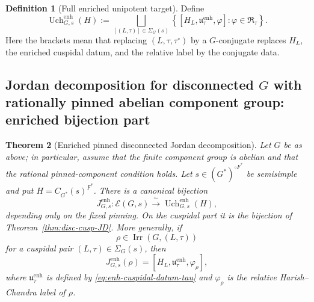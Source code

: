 \documentclass{amsart}
\theoremstyle{plain}
\numberwithin{equation}{section}
\newtheorem{theorem}{Theorem}[section]
\theoremstyle{definition}
\newtheorem{definition}[theorem]{Definition}
\newcommand{\cE}{\mathcal{E}}
\newcommand{\Irr}{\operatorname{Irr}}
\newcommand{\Uch}{\operatorname{Uch}}
\begin{document}
\begin{definition}[Full enriched unipotent target]
\label{def:full-enriched-target}
Define
\[
\Uch^{\mathrm{enh}}_{G,s}(H)
:=
\bigsqcup_{[(L,\tau)]\in\Sigma_G(s)}
\left\{
        [H_L,\mathfrak u^{\mathrm{enh}}_\tau,\varphi]
        :
        \varphi\in\mathfrak R_\tau
\right\}.
\]
Here the brackets mean that replacing \((L,\tau,\tau^\circ)\) by a
\(G\)-conjugate replaces \(H_L\), the enriched cuspidal datum, and the relative
label by the conjugate data.
\end{definition}

\subsection{Jordan decomposition for disconnected $G$ with rationally pinned abelian component group: enriched bijection part}
\begin{theorem}[Enriched pinned disconnected Jordan decomposition]
\label{thm:disc-JD-bijection}
Let \(G\) be as above; in particular, assume that the finite component group is
abelian and that the rational pinned-component condition holds.  Let
\(s\in (G^*)^{\circ F^*}\) be semisimple and put \(H=C_{G^*}(s)^{F^*}\).  There
is a canonical bijection
\[
J^{\mathrm{enh}}_{G,s}:
\cE(G,s)
\xrightarrow{\ \sim\ }
\Uch^{\mathrm{enh}}_{G,s}(H),
\]
depending only on the fixed pinning.  On the cuspidal part it is the bijection
of Theorem~\ref{thm:disc-cusp-JD}.  More generally, if
\[
        \rho\in\Irr(G,(L,\tau))
\]
for a cuspidal pair \((L,\tau)\in\Sigma_G(s)\), then
\[
        J^{\mathrm{enh}}_{G,s}(\rho)
        =
        [H_L,\mathfrak u^{\mathrm{enh}}_\tau,\varphi_\rho],
\]
where \(\mathfrak u^{\mathrm{enh}}_\tau\) is defined by
\eqref{eq:enh-cuspidal-datum-tau} and \(\varphi_\rho\) is the relative
Harish--Chandra label of \(\rho\).
\end{theorem}
\end{document}
